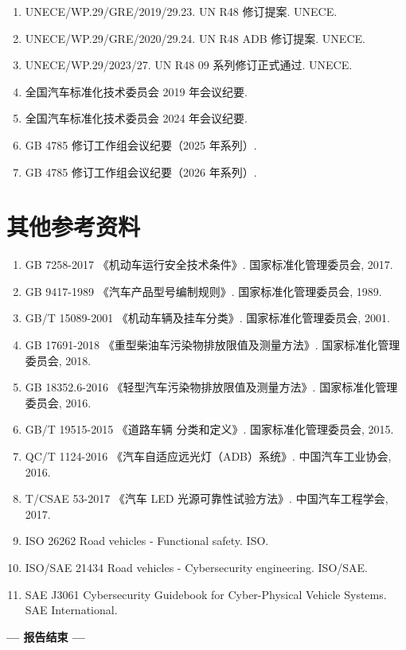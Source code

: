 \begin{enumerate}[leftmargin=2em]
    \item UNECE/WP.29/GRE/2019/29.23. UN R48 修订提案. UNECE.

    \item UNECE/WP.29/GRE/2020/29.24. UN R48 ADB 修订提案. UNECE.

    \item UNECE/WP.29/2023/27. UN R48 09 系列修订正式通过. UNECE.

    \item 全国汽车标准化技术委员会 2019 年会议纪要.

    \item 全国汽车标准化技术委员会 2024 年会议纪要.

    \item GB 4785 修订工作组会议纪要（2025 年系列）.

    \item GB 4785 修订工作组会议纪要（2026 年系列）.
\end{enumerate}

\section{其他参考资料}

\begin{enumerate}[leftmargin=2em]
    \item GB 7258-2017 《机动车运行安全技术条件》. 国家标准化管理委员会, 2017.

    \item GB 9417-1989 《汽车产品型号编制规则》. 国家标准化管理委员会, 1989.

    \item GB/T 15089-2001 《机动车辆及挂车分类》. 国家标准化管理委员会, 2001.

    \item GB 17691-2018 《重型柴油车污染物排放限值及测量方法》. 国家标准化管理委员会, 2018.

    \item GB 18352.6-2016 《轻型汽车污染物排放限值及测量方法》. 国家标准化管理委员会, 2016.

    \item GB/T 19515-2015 《道路车辆 分类和定义》. 国家标准化管理委员会, 2015.

    \item QC/T 1124-2016 《汽车自适应远光灯（ADB）系统》. 中国汽车工业协会, 2016.

    \item T/CSAE 53-2017 《汽车 LED 光源可靠性试验方法》. 中国汽车工程学会, 2017.

    \item ISO 26262 Road vehicles - Functional safety. ISO.

    \item ISO/SAE 21434 Road vehicles - Cybersecurity engineering. ISO/SAE.

    \item SAE J3061 Cybersecurity Guidebook for Cyber-Physical Vehicle Systems. SAE International.
\end{enumerate}

\vspace{2cm}

\begin{center}
\textbf{--- 报告结束 ---}
\end{center}